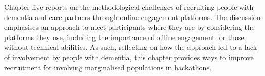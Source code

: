 \begin{itemize}
    Chapter five reports on the methodological challenges of recruiting people with dementia and care partners through online engagement platforms. The discussion emphasises an approach to meet participants where they are by considering the platforms they use, including the importance of offline engagement for those without technical abilities. As such, reflecting on how the approach led to a lack of involvement by people with dementia, this chapter provides ways to improve recruitment for involving marginalised populations in hackathons.
\end{itemize}
